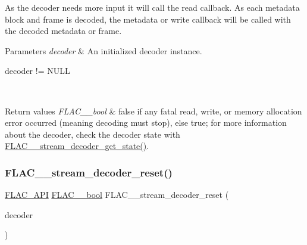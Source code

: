 As the decoder needs more input it will call the read callback. As each metadata block and frame is decoded, the metadata or write callback will be called with the decoded metadata or frame.


\begin{DoxyParams}{Parameters}
{\em decoder} & An initialized decoder instance.  
\begin{DoxyCode}
decoder != NULL 
\end{DoxyCode}
 \\
\hline
\end{DoxyParams}

\begin{DoxyRetVals}{Return values}
{\em F\+L\+A\+C\+\_\+\+\_\+bool} & {\ttfamily false} if any fatal read, write, or memory allocation error occurred (meaning decoding must stop), else {\ttfamily true}; for more information about the decoder, check the decoder state with \hyperlink{group__flac__stream__decoder_ga5899c204ad7183ec04e41855090c0635}{F\+L\+A\+C\+\_\+\+\_\+stream\+\_\+decoder\+\_\+get\+\_\+state()}. \\
\hline
\end{DoxyRetVals}
\mbox{\label{group__flac__stream__decoder_ga2342cf4f3caf9ad20fca1373aaea0c27}} 
\subsubsection{\texorpdfstring{F\+L\+A\+C\+\_\+\+\_\+stream\+\_\+decoder\+\_\+reset()}{FLAC\_\_stream\_decoder\_reset()}}
{\footnotesize\ttfamily \hyperlink{group__flac__export_ga56ca07df8a23310707732b1c0007d6f5}{F\+L\+A\+C\+\_\+\+A\+PI} \hyperlink{ordinals_8h_a95103469f1cbd78b8cf250194985b34e}{F\+L\+A\+C\+\_\+\+\_\+bool} F\+L\+A\+C\+\_\+\+\_\+stream\+\_\+decoder\+\_\+reset (\begin{DoxyParamCaption}\item[{\hyperlink{struct_f_l_a_c_____stream_decoder}{F\+L\+A\+C\+\_\+\+\_\+\+Stream\+Decoder} $\ast$}]{decoder }\end{DoxyParamCaption})}

